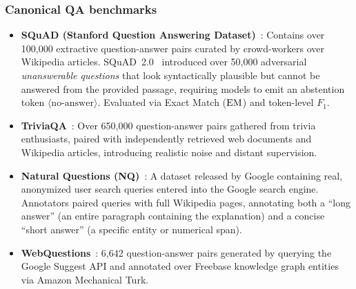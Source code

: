 \documentclass[../../main.tex]{subfiles}
\begin{document}
\subsubsection{Canonical QA benchmarks}
\begin{itemize}
    \item \textbf{SQuAD (Stanford Question Answering Dataset)}~\cite{rajpurkar2016squad}: Contains over 100,000 extractive question-answer pairs curated by crowd-workers over Wikipedia articles. SQuAD~2.0~\cite{rajpurkar2018know} introduced over 50,000 adversarial \textit{unanswerable questions} that look syntactically plausible but cannot be answered from the provided passage, requiring models to emit an abstention token $\langle\text{no-answer}\rangle$. Evaluated via Exact Match ($\mathrm{EM}$) and token-level $F_1$.
    \item \textbf{TriviaQA}~\cite{joshi2017triviaqa}: Over 650,000 question-answer pairs gathered from trivia enthusiasts, paired with independently retrieved web documents and Wikipedia articles, introducing realistic noise and distant supervision.
    \item \textbf{Natural Questions (NQ)}~\cite{kwiatkowski2019natural}: A dataset released by Google containing real, anonymized user search queries entered into the Google search engine. Annotators paired queries with full Wikipedia pages, annotating both a ``long answer'' (an entire paragraph containing the explanation) and a concise ``short answer'' (a specific entity or numerical span).
    \item \textbf{WebQuestions}~\cite{berant2013webquestions}: 6,642 question-answer pairs generated by querying the Google Suggest API and annotated over Freebase knowledge graph entities via Amazon Mechanical Turk.
\end{itemize}
\end{document}
